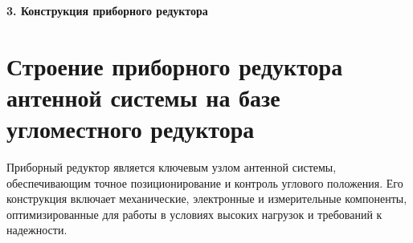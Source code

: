 \newpage

\noindent\textbf{\large 3. Конструкция приборного редуктора }


\section{Строение приборного редуктора антенной системы на базе угломестного редуктора}

Приборный редуктор является ключевым узлом антенной системы, обеспечивающим точное позиционирование и контроль углового положения. 
Его конструкция включает механические, электронные и измерительные компоненты, оптимизированные для работы в условиях высоких нагрузок и требований к надежности.


